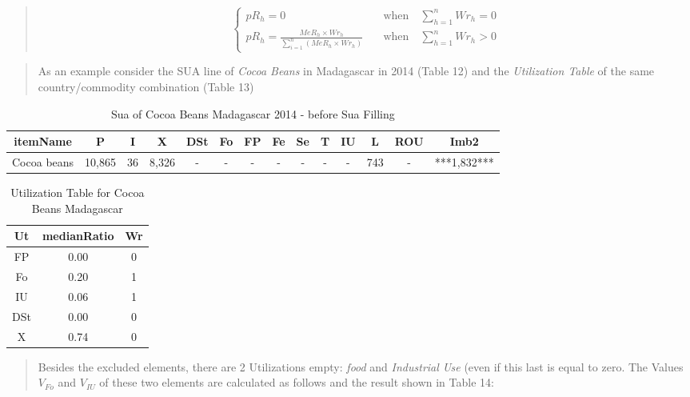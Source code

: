 \documentclass[]{article}
\begin{document}
\begin{quote}
\begin{equation}
\label{eq:weightRank}
\begin{cases}
pR_{h} = 0     & \quad \text{when} \quad \sum \limits_{h=1}^n Wr_{h} = 0\\
pR_{h} = \frac{MeR_{h}\times Wr_{h}}{\sum \limits_{i=1}^n\left(MeR_{h}\times Wr_{h}\right)}     & \quad \text{when} \quad \sum \limits_{h=1}^n Wr_{h} > 0 
\end{cases}
\end{equation}
\end{quote}

\begin{quote}
\end{quote}

\begin{quote}
As an example consider the SUA line of \emph{Cocoa Beans} in Madagascar
in 2014 (Table 12) and the \emph{Utilization Table} of the same
country/commodity combination (Table 13)
\end{quote}

\begin{table}

\caption{\label{tab:t11}Sua of Cocoa Beans Madagascar 2014 - before Sua Filling}
\centering
\begin{tabular}[t]{c|c|c|c|c|c|c|c|c|c|c|c|c|c}
\hline
itemName & P & I & X & DSt & Fo & FP & Fe & Se & T & IU & L & ROU & Imb2\\
\hline
Cocoa beans & 10,865 & 36 & 8,326 & - & - & - & - & - & - & - & 743 & - & ***1,832***\\
\hline
\end{tabular}
\end{table}

\begin{table}

\caption{\label{tab:t12}Utilization Table for Cocoa Beans Madagascar}
\centering
\begin{tabular}[t]{c|c|c}
\hline
Ut & medianRatio & Wr\\
\hline
FP & 0.00 & 0\\
\hline
Fo & 0.20 & 1\\
\hline
IU & 0.06 & 1\\
\hline
DSt & 0.00 & 0\\
\hline
X & 0.74 & 0\\
\hline
\end{tabular}
\end{table}

\begin{quote}
Besides the excluded elements, there are 2 Utilizations empty:
\emph{food} and \emph{Industrial Use} (even if this last is equal to
zero. The Values \(V_{Fo}\) and \(V_{IU}\) of these two elements are
calculated as follows and the result shown in Table 14:
\end{quote}
\end{document}
